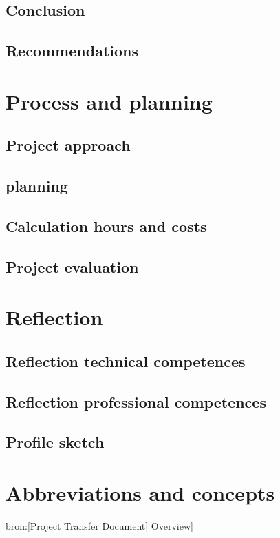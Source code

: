 \documentclass[12pt,a4paper]{report}
\begin{document}
\section{Conclusion}

\section{Recommendations}

\chapter{Process and planning}
\section{Project  approach}

\section{planning}

\section{Calculation hours and costs}

\section{Project evaluation}

\chapter{Reflection}
\section{Reflection technical competences}

\section{Reflection professional competences}

\section{Profile sketch}

\chapter{Abbreviations and concepts}
bron:[Project Transfer Document] Overview]
\end{document}
